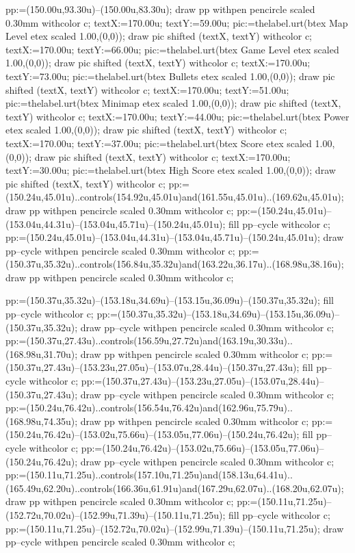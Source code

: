 pp:=(150.00u,93.30u)--(150.00u,83.30u);
draw pp withpen pencircle scaled 0.30mm withcolor c;
textX:=170.00u; textY:=59.00u; pic:=thelabel.urt(btex {Map Level} etex scaled 1.00,(0,0)); draw pic shifted (textX, textY) withcolor c;
textX:=170.00u; textY:=66.00u; pic:=thelabel.urt(btex {Game Level} etex scaled 1.00,(0,0)); draw pic shifted (textX, textY) withcolor c;
textX:=170.00u; textY:=73.00u; pic:=thelabel.urt(btex {Bullets} etex scaled 1.00,(0,0)); draw pic shifted (textX, textY) withcolor c;
textX:=170.00u; textY:=51.00u; pic:=thelabel.urt(btex {Minimap} etex scaled 1.00,(0,0)); draw pic shifted (textX, textY) withcolor c;
textX:=170.00u; textY:=44.00u; pic:=thelabel.urt(btex {Power} etex scaled 1.00,(0,0)); draw pic shifted (textX, textY) withcolor c;
textX:=170.00u; textY:=37.00u; pic:=thelabel.urt(btex {Score} etex scaled 1.00,(0,0)); draw pic shifted (textX, textY) withcolor c;
textX:=170.00u; textY:=30.00u; pic:=thelabel.urt(btex {High Score} etex scaled 1.00,(0,0)); draw pic shifted (textX, textY) withcolor c;
pp:=(150.24u,45.01u)..controls(154.92u,45.01u)and(161.55u,45.01u)..(169.62u,45.01u);
draw pp withpen pencircle scaled 0.30mm withcolor c;
pp:=(150.24u,45.01u)--(153.04u,44.31u)--(153.04u,45.71u)--(150.24u,45.01u);
fill pp--cycle withcolor c;
pp:=(150.24u,45.01u)--(153.04u,44.31u)--(153.04u,45.71u)--(150.24u,45.01u);
draw pp--cycle withpen pencircle scaled 0.30mm withcolor c;
pp:=(150.37u,35.32u)..controls(156.84u,35.32u)and(163.22u,36.17u)..(168.98u,38.16u);
draw pp withpen pencircle scaled 0.30mm withcolor c;

pp:=(150.37u,35.32u)--(153.18u,34.69u)--(153.15u,36.09u)--(150.37u,35.32u);
fill pp--cycle withcolor c;
pp:=(150.37u,35.32u)--(153.18u,34.69u)--(153.15u,36.09u)--(150.37u,35.32u);
draw pp--cycle withpen pencircle scaled 0.30mm withcolor c;
pp:=(150.37u,27.43u)..controls(156.59u,27.72u)and(163.19u,30.33u)..(168.98u,31.70u);
draw pp withpen pencircle scaled 0.30mm withcolor c;
pp:=(150.37u,27.43u)--(153.23u,27.05u)--(153.07u,28.44u)--(150.37u,27.43u);
fill pp--cycle withcolor c;
pp:=(150.37u,27.43u)--(153.23u,27.05u)--(153.07u,28.44u)--(150.37u,27.43u);
draw pp--cycle withpen pencircle scaled 0.30mm withcolor c;
pp:=(150.24u,76.42u)..controls(156.54u,76.42u)and(162.96u,75.79u)..(168.98u,74.35u);
draw pp withpen pencircle scaled 0.30mm withcolor c;
pp:=(150.24u,76.42u)--(153.02u,75.66u)--(153.05u,77.06u)--(150.24u,76.42u);
fill pp--cycle withcolor c;
pp:=(150.24u,76.42u)--(153.02u,75.66u)--(153.05u,77.06u)--(150.24u,76.42u);
draw pp--cycle withpen pencircle scaled 0.30mm withcolor c;
pp:=(150.11u,71.25u)..controls(157.10u,71.25u)and(158.13u,64.41u)..(165.49u,62.20u)..controls(166.36u,61.91u)and(167.29u,62.07u)..(168.20u,62.07u);
draw pp withpen pencircle scaled 0.30mm withcolor c;
pp:=(150.11u,71.25u)--(152.72u,70.02u)--(152.99u,71.39u)--(150.11u,71.25u);
fill pp--cycle withcolor c;
pp:=(150.11u,71.25u)--(152.72u,70.02u)--(152.99u,71.39u)--(150.11u,71.25u);
draw pp--cycle withpen pencircle scaled 0.30mm withcolor c;


